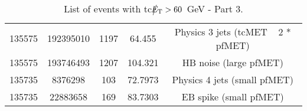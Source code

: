 \begin{table}[htbp]
\begin{center}
\begin{tabular}{|c|c|c|c|c|}
      135575  & 192395010    & 1197 &    64.455  & Physics 3 jets (tcMET ~ 2 * pfMET) \\
      135575  & 193746493    & 1207 &    104.321 & HB noise (large pfMET) \\
      135735  & 8376298      & 103  &    72.7973 & Physics 4 jets (small pfMET) \\
      135735  & 22883658     & 169  &    83.7303 & EB spike (small pfMET) \\       
      \hline
    \end{tabular}
    \caption{List of events with tc$\big\slash\hspace{-1.6ex}{E_\text{T}}>60$~GeV - Part 3.}        
    \label{tab:tcMETlist3}
  \end{center}
\end{table}



